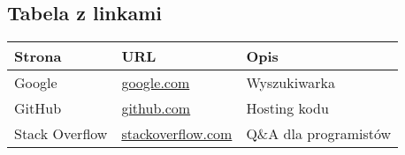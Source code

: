 \documentclass{article}
\begin{document}
\subsection{Tabela z linkami}



\begin{tabular}{|l|l|l|}
\toprule
\textbf{Strona} & \textbf{URL} & \textbf{Opis} \\
\midrule
Google & \href{https://google.com}{google.com} & Wyszukiwarka \\
GitHub & \href{https://github.com}{github.com} & Hosting kodu \\
Stack Overflow & \href{https://stackoverflow.com}{stackoverflow.com} & Q\&A dla programistów \\
\bottomrule
\end{tabular}
\end{document}
